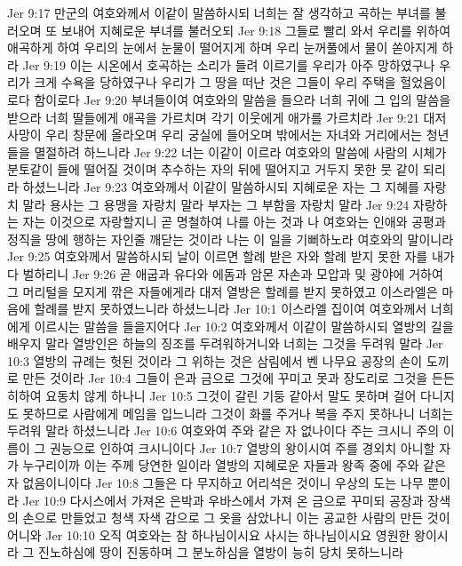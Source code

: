Jer 9:17  만군의 여호와께서 이같이 말씀하시되 너희는 잘 생각하고 곡하는 부녀를 불러오며 또 보내어 지혜로운 부녀를 불러오되
Jer 9:18  그들로 빨리 와서 우리를 위하여 애곡하게 하여 우리의 눈에서 눈물이 떨어지게 하며 우리 눈꺼풀에서 물이 쏟아지게 하라
Jer 9:19  이는 시온에서 호곡하는 소리가 들려 이르기를 우리가 아주 망하였구나 우리가 크게 수욕을 당하였구나 우리가 그 땅을 떠난 것은 그들이 우리 주택을 헐었음이로다 함이로다
Jer 9:20  부녀들이여 여호와의 말씀을 들으라 너희 귀에 그 입의 말씀을 받으라 너희 딸들에게 애곡을 가르치며 각기 이웃에게 애가를 가르치라
Jer 9:21  대저 사망이 우리 창문에 올라오며 우리 궁실에 들어오며 밖에서는 자녀와 거리에서는 청년들을 멸절하려 하느니라
Jer 9:22  너는 이같이 이르라 여호와의 말씀에 사람의 시체가 분토같이 들에 떨어질 것이며 추수하는 자의 뒤에 떨어지고 거두지 못한 뭇 같이 되리라 하셨느니라
Jer 9:23  여호와께서 이같이 말씀하시되 지혜로운 자는 그 지혜를 자랑치 말라 용사는 그 용맹을 자랑치 말라 부자는 그 부함을 자랑치 말라
Jer 9:24  자랑하는 자는 이것으로 자랑할지니 곧 명철하여 나를 아는 것과 나 여호와는 인애와 공평과 정직을 땅에 행하는 자인줄 깨닫는 것이라 나는 이 일을 기뻐하노라 여호와의 말이니라
Jer 9:25  여호와께서 말씀하시되 날이 이르면 할례 받은 자와 할례 받지 못한 자를 내가 다 벌하리니
Jer 9:26  곧 애굽과 유다와 에돔과 암몬 자손과 모압과 및 광야에 거하여 그 머리털을 모지게 깎은 자들에게라 대저 열방은 할례를 받지 못하였고 이스라엘은 마음에 할례를 받지 못하였느니라 하셨느니라
Jer 10:1  이스라엘 집이여 여호와께서 너희에게 이르시는 말씀을 들을지어다
Jer 10:2  여호와께서 이같이 말씀하시되 열방의 길을 배우지 말라 열방인은 하늘의 징조를 두려워하거니와 너희는 그것을 두려워 말라
Jer 10:3  열방의 규례는 헛된 것이라 그 위하는 것은 삼림에서 벤 나무요 공장의 손이 도끼로 만든 것이라
Jer 10:4  그들이 은과 금으로 그것에 꾸미고 못과 장도리로 그것을 든든히하여 요동치 않게 하나니
Jer 10:5  그것이 갈린 기둥 같아서 말도 못하며 걸어 다니지도 못하므로 사람에게 메임을 입느니라 그것이 화를 주거나 복을 주지 못하나니 너희는 두려워 말라 하셨느니라
Jer 10:6  여호와여 주와 같은 자 없나이다 주는 크시니 주의 이름이 그 권능으로 인하여 크시니이다
Jer 10:7  열방의 왕이시여 주를 경외치 아니할 자가 누구리이까 이는 주께 당연한 일이라 열방의 지혜로운 자들과 왕족 중에 주와 같은자 없음이니이다
Jer 10:8  그들은 다 무지하고 어리석은 것이니 우상의 도는 나무 뿐이라
Jer 10:9  다시스에서 가져온 은박과 우바스에서 가져 온 금으로 꾸미되 공장과 장색의 손으로 만들었고 청색 자색 감으로 그 옷을 삼았나니 이는 공교한 사람의 만든 것이어니와
Jer 10:10  오직 여호와는 참 하나님이시요 사시는 하나님이시요 영원한 왕이시라 그 진노하심에 땅이 진동하며 그 분노하심을 열방이 능히 당치 못하느니라
